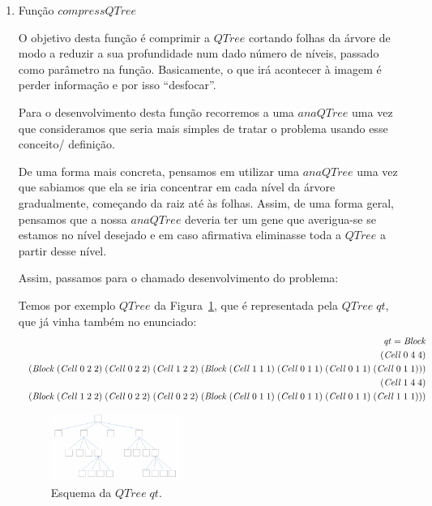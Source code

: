 \documentclass[a4paper]{article}
\newcommand{\Conid}[1]{\mathit{#1}}
\newcommand{\Varid}[1]{\mathit{#1}}
\begin{document}
\begin{enumerate}
\item Função \ensuremath{\Varid{compressQTree}}

O objetivo desta função é comprimir a \ensuremath{\Conid{QTree}} cortando folhas da árvore de modo
a reduzir a sua profundidade num dado número de níveis, passado como parâmetro na função.
Basicamente, o que irá acontecer à imagem é perder informação e por isso ``desfocar''.

Para o desenvolvimento desta função recorremos a uma \ensuremath{\Varid{anaQTree}} uma vez que
consideramos que seria mais simples de tratar o problema usando esse
conceito/ definição.

De uma forma mais concreta, pensamos em utilizar uma \ensuremath{\Varid{anaQTree}} uma vez que sabiamos que
ela se iria concentrar em cada nível da árvore gradualmente, começando
da raiz até às folhas. Assim, de uma forma geral, pensamos
que a nossa \ensuremath{\Varid{anaQTree}} deveria ter um gene que averigua-se se estamos no
nível desejado e em caso afirmativa eliminasse toda a \ensuremath{\Conid{QTree}} a partir desse nível.


Assim, passamos para o chamado desenvolvimento do problema:

Temos por exemplo \ensuremath{\Conid{QTree}} da Figura~\ref{fig:qt},
que é representada pela \ensuremath{\Conid{QTree}\;\Varid{qt}}, que já vinha também no enunciado:
\begin{eqnarray*}
\start
\ensuremath{\Varid{qt}\mathrel{=}\Conid{Block}}
\more
\ensuremath{(\Conid{Cell}\;\mathrm{0}\;\mathrm{4}\;\mathrm{4})}
\more
\ensuremath{(\Conid{Block}\;(\Conid{Cell}\;\mathrm{0}\;\mathrm{2}\;\mathrm{2})\;(\Conid{Cell}\;\mathrm{0}\;\mathrm{2}\;\mathrm{2})\;(\Conid{Cell}\;\mathrm{1}\;\mathrm{2}\;\mathrm{2})\;(\Conid{Block}\;(\Conid{Cell}\;\mathrm{1}\;\mathrm{1}\;\mathrm{1})\;(\Conid{Cell}\;\mathrm{0}\;\mathrm{1}\;\mathrm{1})\;(\Conid{Cell}\;\mathrm{0}\;\mathrm{1}\;\mathrm{1})\;(\Conid{Cell}\;\mathrm{0}\;\mathrm{1}\;\mathrm{1})))}
\more
\ensuremath{(\Conid{Cell}\;\mathrm{1}\;\mathrm{4}\;\mathrm{4})}
\more
\ensuremath{(\Conid{Block}\;(\Conid{Cell}\;\mathrm{1}\;\mathrm{2}\;\mathrm{2})\;(\Conid{Cell}\;\mathrm{0}\;\mathrm{2}\;\mathrm{2})\;(\Conid{Cell}\;\mathrm{0}\;\mathrm{2}\;\mathrm{2})\;(\Conid{Block}\;(\Conid{Cell}\;\mathrm{0}\;\mathrm{1}\;\mathrm{1})\;(\Conid{Cell}\;\mathrm{0}\;\mathrm{1}\;\mathrm{1})\;(\Conid{Cell}\;\mathrm{0}\;\mathrm{1}\;\mathrm{1})\;(\Conid{Cell}\;\mathrm{1}\;\mathrm{1}\;\mathrm{1})))}
\end{eqnarray*}

\begin{figure}
\begin{center}
\includegraphics[width=0.4\textwidth]{imgs/qt.png}
\end{center}
\caption{Esquema da \ensuremath{\Conid{QTree}\;\Varid{qt}}.}
\label{fig:qt}
\end{figure}



\end{enumerate}
\end{document}
